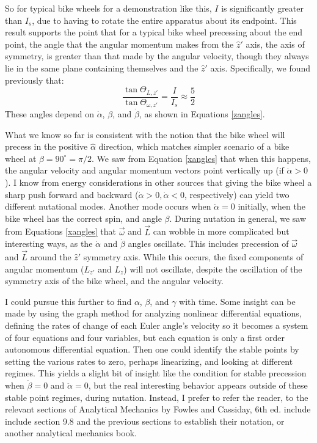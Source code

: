 \documentclass[10pt]{article}
\begin{document}
So for typical bike wheels for a demonstration like this, $I$ is 
significantly greater than $I_s$, due to having to rotate 
the entire apparatus about its endpoint. This result supports 
the point that for a typical bike wheel precessing about the 
end point, the angle that the angular momentum makes from the $\hat{z}'$ 
axis, the axis of symmetry, is greater than that made by the angular velocity, 
though they always lie in the same plane containing themselves 
and the $\hat{z}'$ axis. Specifically, we found previously that:
\begin{equation*}
    \frac{\tan\Theta_{L,z'}}{\tan\Theta_{\omega,z'}} = \frac{I}{I_s}
        \approx\frac{5}{2}
\end{equation*}
These angles depend on $\dot\alpha$, $\beta$, and $\dot\beta$, as shown 
in Equations \ref{zangles}.

What we know so far is consistent with the notion that the bike wheel 
will precess in the positive $\hat{\alpha}$ direction, which matches 
simpler scenario of a bike wheel at $\beta=90^\circ=\pi/2$. We saw from 
Equation \ref{xangles} that when this happens, the angular velocity and 
angular momentum vectors point vertically up (if $\dot\alpha>0$).
I know from energy considerations in other sources
that giving the bike wheel a sharp push forward and backward 
($\dot\alpha >0, \dot\alpha<0$, respectively) can yield two different 
nutational modes. Another mode occurs when $\dot\alpha=0$ initially, 
when the bike wheel has the correct spin, and angle $\beta$. 
During nutation in general, we saw from Equations 
\ref{xangles} that $\vec\omega$ and $\vec L$ can wobble in 
more complicated but interesting ways, as the $\dot\alpha$ and $\dot\beta$ 
angles oscillate. This includes precession of $\vec\omega$ and $\vec L$
around the $\hat{z}'$ symmetry axis. While this occurs, the fixed 
components of angular momentum ($L_{z'}$ and $L_z$) 
will not oscillate, despite the oscillation of 
the symmetry axis of the bike wheel, and the angular velocity.

I could pursue this further to find $\alpha$, $\beta$, and 
$\gamma$ with time. Some insight can be made by using the graph method for 
analyzing nonlinear differential equations, defining the rates of change of 
each Euler angle's velocity so it becomes a system of four equations and four 
variables, but each equation is only a first order autonomous differential 
equation. Then one could identify the stable points by setting the 
various rates to zero, perhaps linearizing, and looking at different 
regimes. This yields a slight bit of insight like the condition for 
stable precession when $\dot\beta=0$ and $\ddot\alpha=0$, 
but the real interesting behavior appears outside of these stable point 
regimes, during nutation. Instead, I prefer to refer 
the reader, to the relevant sections of Analytical Mechanics by 
Fowles and Cassiday, 6th ed. include include section 9.8 and the previous 
sections to establish their notation, or another analytical mechanics book.
\end{document}
